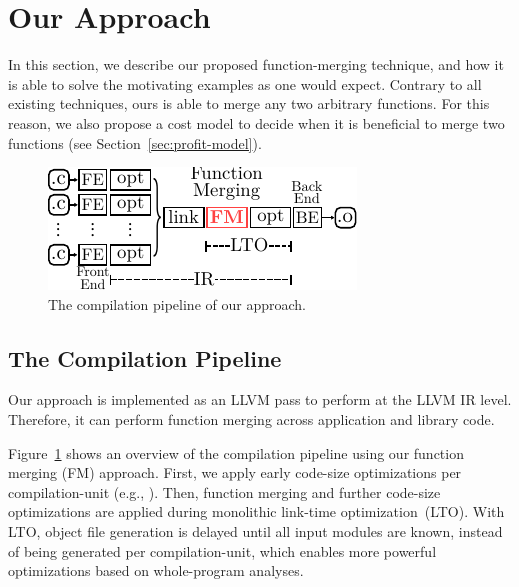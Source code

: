 \section{Our Approach} \label{sec:fm}

In this section, we describe our proposed function-merging technique, and how it is able to solve the motivating examples as one would
expect. Contrary to all existing techniques, ours is able to merge any two arbitrary functions. For this reason, we also propose a cost
model to decide when it is beneficial to merge two functions (see Section~\ref{sec:profit-model}).


\begin{figure}[t!]
  \centering
  \includegraphics[width=0.7\linewidth]{figs/opt-pipeline.pdf}
  \caption{The compilation pipeline of our approach.}
  \label{fig:opt-pipeline}
\end{figure}

\subsection{The Compilation Pipeline}
Our approach is implemented as an LLVM pass to perform at the LLVM IR level. Therefore, it can perform function merging across application
and library code.

Figure~\ref{fig:opt-pipeline} shows an overview of the compilation pipeline using our function merging (FM) approach. First, we apply early
code-size optimizations per compilation-unit (e.g., ). Then, function merging and further code-size
optimizations are applied during monolithic link-time optimization~(LTO). With LTO, object file generation is delayed until all input
modules are known, instead of being generated per
compilation-unit, which enables more powerful optimizations based on whole-program analyses. %

